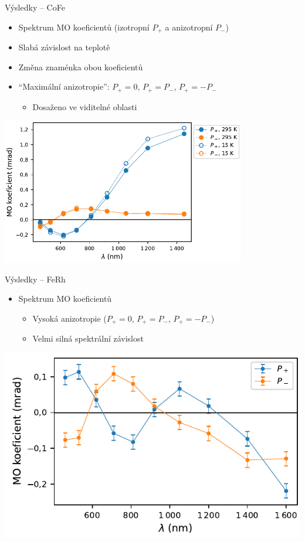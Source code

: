 \documentclass{beamer}
\begin{document}
\begin{frame}{Výsledky -- CoFe}
    \begin{itemize}
        \item Spektrum MO koeficientů (izotropní $P_+$ a anizotropní $P_-$)
        \item<2-> Slabá závislost na teplotě
        \item<3-> Změna znaménka obou koeficientů
        \item<4-> ``Maximální anizotropie'': $P_+=0$, $P_+=P_-$, $P_+=-P_-$
            \begin{itemize}
                \item<3-> Dosaženo ve viditelné oblasti
            \end{itemize}
   \end{itemize} 
   \vspace{0.1cm}
   \hspace{0.1cm}\begin{center}\includegraphics[width=0.8\textwidth]{img/cofe-pmld.pdf}\end{center}
\end{frame}

\begin{frame}{Výsledky -- FeRh}
    \begin{itemize}
        \item Spektrum MO koeficientů
            \begin{itemize}
                \item<2-> Vysoká anizotropie ($P_+=0$, $P_+=P_-$, $P_+=-P_-$)
                \item<3-> Velmi silná spektrální závislost
            \end{itemize}
    \end{itemize}
    \includegraphics{img/ferh-pmld.pdf}
\end{frame}
\end{document}
